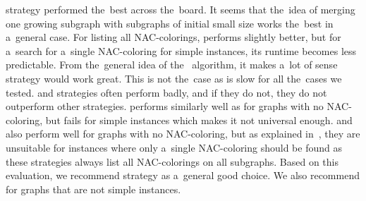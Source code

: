 \MergeLinear{} strategy performed the~best across the~board.
It seems that the~idea of merging one growing subgraph
with subgraphs of initial small size works the~best
in a~general case.
%
For listing all NAC-colorings, \SharedVertices{} performs
slightly better, but for a~search for a~single NAC-coloring for simple instances,
its runtime becomes less predictable.
%
From the~general idea of the~\Subgraphs{} algorithm,
it makes a~lot of sense \Log{} strategy would work great.
This is not the~case as \Log{} is slow for all the~cases we tested.
%
\MinMax{} and \SortedBits{} strategies often perform badly,
and if they do not, they do not outperform other strategies.
%
\PromisingCycles{} performs similarly well as \Neighbors{}
for graphs with no NAC-coloring,
but fails for simple instances which makes it not universal enough.
%
\SortedSize{} and \Score{} also perform well for graphs with no NAC-coloring,
but as explained in~,
they are unsuitable for instances where only a~single NAC-coloring
should be found as these strategies always list all NAC-colorings
on all subgraphs.
%
Based on this evaluation, we recommend strategy \MergeLinear{} as a~general good choice.
We also recommend \SharedVertices{} for graphs that are not simple instances.

